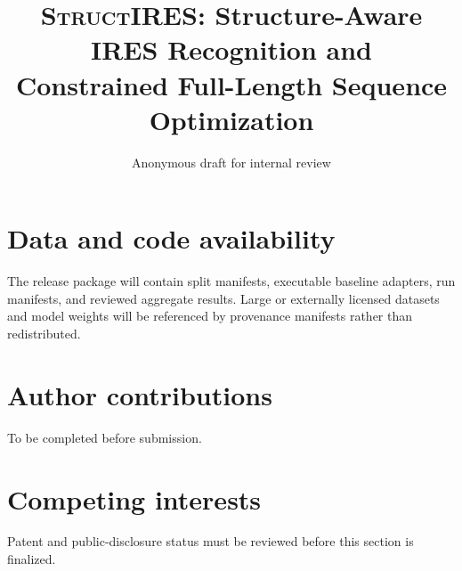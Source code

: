 \documentclass[10pt]{article}
\title{\textsc{StructIRES}: Structure-Aware IRES Recognition and\\
Constrained Full-Length Sequence Optimization}
\author{Anonymous draft for internal review}
\date{}
\begin{document}
\maketitle







\section*{Data and code availability}
The release package will contain split manifests, executable baseline adapters, run manifests,
and reviewed aggregate results. Large or externally licensed datasets and model weights will be
referenced by provenance manifests rather than redistributed.

\section*{Author contributions}
To be completed before submission.

\section*{Competing interests}
Patent and public-disclosure status must be reviewed before this section is finalized.



\end{document}
